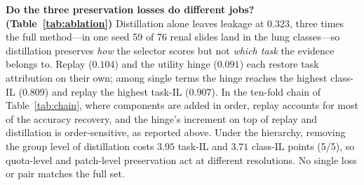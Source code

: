 \documentclass{article}
\begin{document}
\begin{table}[!htb]
\centering\footnotesize\renewcommand{\arraystretch}{0.92}
\setlength{\tabcolsep}{3.5pt}
\caption{\textbf{Preservation-component ablation with selection-level metrics} (flat, fold 1, 5-seed means). Replay restores old-task competence, the utility-preservation hinge preserves functional utility, and distillation stabilizes selection behavior; no single term or pair matches the full set. Jaccard and $\Delta U$ are reported for the lifecycle arms.}
\label{tab:ablation}
\end{table}

\textbf{Do the three preservation losses do different jobs? (Table~\ref{tab:ablation})}
Distillation alone leaves leakage at $0.323$, three times the full method---in one seed 59 of 76 renal slides land in the lung classes---so distillation preserves \emph{how} the selector scores but not \emph{which task} the evidence belongs to. Replay ($0.104$) and the utility hinge ($0.091$) each restore task attribution on their own; among single terms the hinge reaches the highest class-IL ($0.809$) and replay the highest task-IL ($0.907$). In the ten-fold chain of Table~\ref{tab:chain}, where components are added in order, replay accounts for most of the accuracy recovery, and the hinge's increment on top of replay and distillation is order-sensitive, as reported above. Under the hierarchy, removing the group level of distillation costs $3.95$ task-IL and $3.71$ class-IL points (5/5), so quota-level and patch-level preservation act at different resolutions. No single loss or pair matches the full set.
\end{document}
